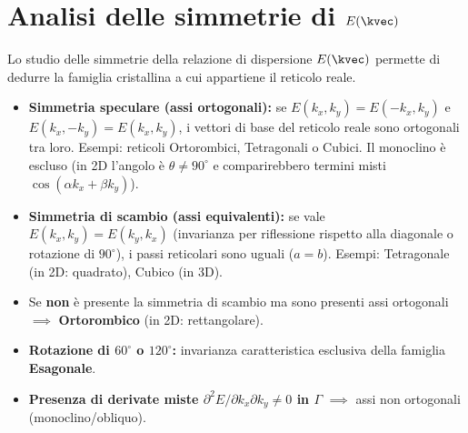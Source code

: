 \section{Analisi delle simmetrie di $E(\kvec)$}
Lo studio delle simmetrie della relazione di dispersione $E(\kvec)$ permette di dedurre la famiglia cristallina a cui appartiene il reticolo reale.
\begin{itemize}
    \item \textbf{Simmetria speculare (assi ortogonali):} se $E(k_x,k_y)=E(-k_x,k_y)$ e $E(k_x,-k_y)=E(k_x,k_y)$, i vettori di base del reticolo reale sono ortogonali tra loro. Esempi: reticoli Ortorombici, Tetragonali o Cubici. Il monoclino è escluso (in 2D l'angolo è $\theta\neq90^\circ$ e comparirebbero termini misti $\cos(\alpha k_x+\beta k_y)$).
    \item \textbf{Simmetria di scambio (assi equivalenti):} se vale $E(k_x,k_y)=E(k_y,k_x)$ (invarianza per riflessione rispetto alla diagonale o rotazione di $90^\circ$), i passi reticolari sono uguali ($a=b$). Esempi: Tetragonale (in 2D: quadrato), Cubico (in 3D).
    \item Se \textbf{non} è presente la simmetria di scambio ma sono presenti assi ortogonali $\implies$ \textbf{Ortorombico} (in 2D: rettangolare).
    \item \textbf{Rotazione di $60^\circ$ o $120^\circ$:} invarianza caratteristica esclusiva della famiglia \textbf{Esagonale}.
    \item \textbf{Presenza di derivate miste $\partial^2E/\partial k_x\partial k_y \neq 0$ in $\Gamma$} $\implies$ assi non ortogonali (monoclino/obliquo).
\end{itemize}


